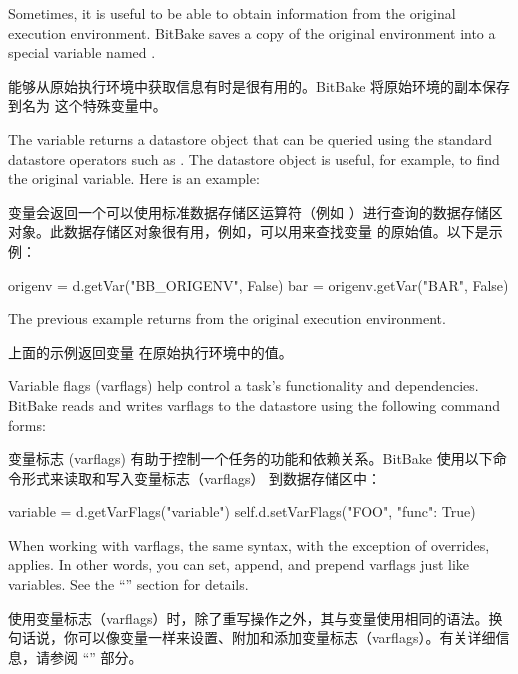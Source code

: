 Sometimes, it is useful to be able to obtain information from the original execution environment. BitBake saves a copy of the original environment into a special variable named .

能够从原始执行环境中获取信息有时是很有用的。BitBake 将原始环境的副本保存到名为  这个特殊变量中。

The  variable returns a datastore object that can be queried using the standard datastore operators such as . The datastore object is useful, for example, to find the original  variable. Here is an example:

 变量会返回一个可以使用标准数据存储区运算符（例如 ）进行查询的数据存储区对象。此数据存储区对象很有用，例如，可以用来查找变量  的原始值。以下是示例：

\begin{pyglist}
origenv = d.getVar("BB_ORIGENV", False)
bar = origenv.getVar("BAR", False)
\end{pyglist}

The previous example returns  from the original execution environment.

上面的示例返回变量  在原始执行环境中的值。

\label{section:Variable Flags}

Variable flags (varflags) help control a task's functionality and dependencies. BitBake reads and writes varflags to the datastore using the following command forms:

变量标志 (varflags) 有助于控制一个任务的功能和依赖关系。BitBake 使用以下命令形式来读取和写入变量标志（varflags） 到数据存储区中：

\begin{pyglist}
variable = d.getVarFlags("variable")
self.d.setVarFlags("FOO", {"func": True})
\end{pyglist}

When working with varflags, the same syntax, with the exception of overrides, applies. In other words, you can set, append, and prepend varflags just like variables. See the ``'' section for details.

使用变量标志（varflags）时，除了重写操作之外，其与变量使用相同的语法。换句话说，你可以像变量一样来设置、附加和添加变量标志（varflags）。有关详细信息，请参阅 ``'' 部分。

